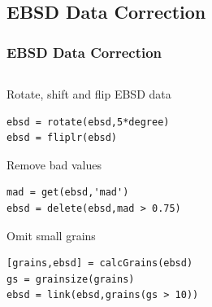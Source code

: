 \subsection*{EBSD Data Correction}


\begin{frame}[fragile]
 \frametitle{EBSD Data Correction}

  \begin{columns}
   \begin{column}{8cm}
	Rotate, shift and flip EBSD data
\begin{lstlisting}
ebsd = rotate(ebsd,5*degree)
ebsd = fliplr(ebsd)
\end{lstlisting}

        \pause
	\medskip

        Remove bad values
\begin{lstlisting}
mad = get(ebsd,'mad')
ebsd = delete(ebsd,mad > 0.75)
\end{lstlisting}

        \pause
	\medskip

       Omit small grains
\begin{lstlisting}
[grains,ebsd] = calcGrains(ebsd)
gs = grainsize(grains)
ebsd = link(ebsd,grains(gs > 10))
\end{lstlisting}

   \end{column}


\end{columns}
\end{frame}
